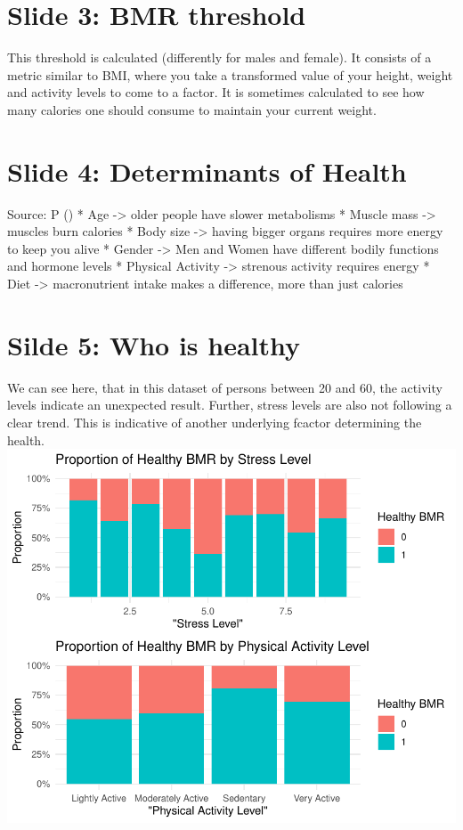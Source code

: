 \documentclass[11pt,preprint]{elsarticle}
\numberwithin{equation}{section}
\numberwithin{figure}{section}
\numberwithin{table}{section}
\begin{document}
\section{Slide 3: BMR threshold}\label{slide-3-bmr-threshold}

This threshold is calculated (differently for males and female). It
consists of a metric similar to BMI, where you take a transformed value
of your height, weight and activity levels to come to a factor. It is
sometimes calculated to see how many calories one should consume to
maintain your current weight.

\section{Slide 4: Determinants of
Health}\label{slide-4-determinants-of-health}

Source: P () * Age
-\textgreater{} older people have slower metabolisms * Muscle mass
-\textgreater{} muscles burn calories * Body size -\textgreater{} having
bigger organs requires more energy to keep you alive * Gender
-\textgreater{} Men and Women have different bodily functions and
hormone levels * Physical Activity -\textgreater{} strenous activity
requires energy * Diet -\textgreater{} macronutrient intake makes a
difference, more than just calories

\section{Silde 5: Who is healthy}\label{silde-5-who-is-healthy}

We can see here, that in this dataset of persons between 20 and 60, the
activity levels indicate an unexpected result. Further, stress levels
are also not following a clear trend. This is indicative of another
underlying fcactor determining the health.\\
\includegraphics{Question5_files/figure-latex/unnamed-chunk-1-1.pdf}
\end{document}
